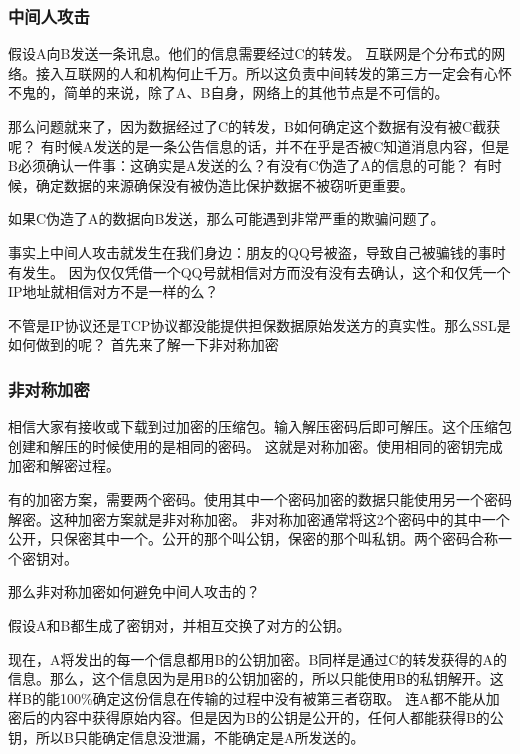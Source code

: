 \begin{insertnote}
\subsubsection*{中间人攻击}

假设A向B发送一条讯息。他们的信息需要经过C的转发。
互联网是个分布式的网络。接入互联网的人和机构何止千万。所以这负责中间转发的第三方一定会有心怀不鬼的，简单的来说，除了A、B自身，网络上的其他节点是不可信的。 

那么问题就来了，因为数据经过了C的转发，B如何确定这个数据有没有被C截获呢？
有时候A发送的是一条公告信息的话，并不在乎是否被C知道消息内容，但是B必须确认一件事：这确实是A发送的么？有没有C伪造了A的信息的可能？ 有时候，确定数据的来源确保没有被伪造比保护数据不被窃听更重要。

如果C伪造了A的数据向B发送，那么可能遇到非常严重的欺骗问题了。

事实上中间人攻击就发生在我们身边：朋友的QQ号被盗，导致自己被骗钱的事时有发生。
因为仅仅凭借一个QQ号就相信对方而没有没有去确认，这个和仅凭一个IP地址就相信对方不是一样的么？

\end{insertnote}

不管是IP协议还是TCP协议都没能提供担保数据原始发送方的真实性。那么SSL是如何做到的呢？
首先来了解一下非对称加密

\begin{insertnote}
\subsubsection*{非对称加密}
相信大家有接收或下载到过加密的压缩包。输入解压密码后即可解压。这个压缩包创建和解压的时候使用的是相同的密码。
这就是对称加密。使用相同的密钥完成加密和解密过程。

有的加密方案，需要两个密码。使用其中一个密码加密的数据只能使用另一个密码解密。这种加密方案就是非对称加密。
非对称加密通常将这2个密码中的其中一个公开，只保密其中一个。公开的那个叫公钥，保密的那个叫私钥。两个密码合称一个密钥对。

\end{insertnote}

那么非对称加密如何避免中间人攻击的？

假设A和B都生成了密钥对，并相互交换了对方的公钥。

现在，A将发出的每一个信息都用B的公钥加密。B同样是通过C的转发获得的A的信息。那么，这个信息因为是用B的公钥加密的，所以只能使用B的私钥解开。这样B的能100\%确定这份信息在传输的过程中没有被第三者窃取。
连A都不能从加密后的内容中获得原始内容。但是因为B的公钥是公开的，任何人都能获得B的公钥，所以B只能确定信息没泄漏，不能确定是A所发送的。

